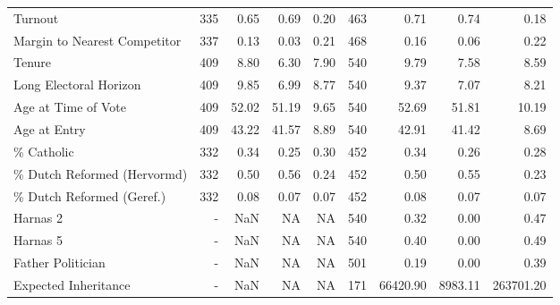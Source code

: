 \begin{table}[!h]
{\begin{tabular}[t]{lrrrrrrrr}
Turnout & 335 & \num{0.65} & \num{0.69} & \num{0.20} & 463 & \num{0.71} & \num{0.74} & \num{0.18}\\
Margin to Nearest Competitor & 337 & \num{0.13} & \num{0.03} & \num{0.21} & 468 & \num{0.16} & \num{0.06} & \num{0.22}\\
Tenure & 409 & \num{8.80} & \num{6.30} & \num{7.90} & 540 & \num{9.79} & \num{7.58} & \num{8.59}\\
Long Electoral Horizon & 409 & \num{9.85} & \num{6.99} & \num{8.77} & 540 & \num{9.37} & \num{7.07} & \num{8.21}\\
Age at Time of Vote & 409 & \num{52.02} & \num{51.19} & \num{9.65} & 540 & \num{52.69} & \num{51.81} & \num{10.19}\\
Age at Entry & 409 & \num{43.22} & \num{41.57} & \num{8.89} & 540 & \num{42.91} & \num{41.42} & \num{8.69}\\
\% Catholic & 332 & \num{0.34} & \num{0.25} & \num{0.30} & 452 & \num{0.34} & \num{0.26} & \num{0.28}\\
\% Dutch Reformed (Hervormd) & 332 & \num{0.50} & \num{0.56} & \num{0.24} & 452 & \num{0.50} & \num{0.55} & \num{0.23}\\
\% Dutch Reformed (Geref.) & 332 & \num{0.08} & \num{0.07} & \num{0.07} & 452 & \num{0.08} & \num{0.07} & \num{0.07}\\
Harnas 2 & - & \num{NaN} & \num{NA} & \num{NA} & 540 & \num{0.32} & \num{0.00} & \num{0.47}\\
Harnas 5 & - & \num{NaN} & \num{NA} & \num{NA} & 540 & \num{0.40} & \num{0.00} & \num{0.49}\\
Father Politician & - & \num{NaN} & \num{NA} & \num{NA} & 501 & \num{0.19} & \num{0.00} & \num{0.39}\\
Expected Inheritance & - & \num{NaN} & \num{NA} & \num{NA} & 171 & \num{66420.90} & \num{8983.11} & \num{263701.20}\\
\bottomrule
\end{tabular}}
\end{table}
